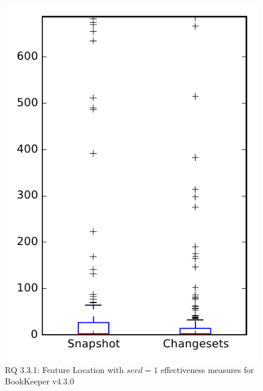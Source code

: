 
\begin{figure}
\centering
\includegraphics[height=0.4\textheight]{figures/flt_seed/rq1_bookkeeper_1}
\caption{RQ 3.3.1: Feature Location with $seed=1$ effectiveness measures for BookKeeper v4.3.0}
\label{fig:flt_seed:rq1:bookkeeper}
\end{figure}
